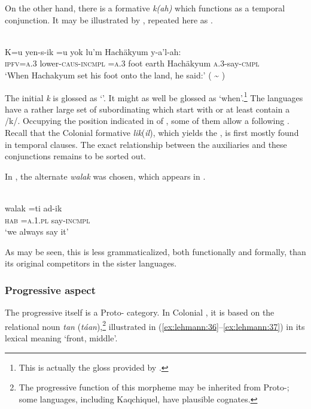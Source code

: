 \documentclass[output=paper]{langsci/langscibook}
\begin{document}
On the other hand, there is a formative \textit{k(ah)} which functions as a temporal conjunction. It may be illustrated by , repeated here as .


\ea\label{ex:lehmann:34}
\\
  \gll    K=u      yen-s-ik          =u    yok  lu’m    Hachäkyum    y-a’l-ah:\\
  \textsc{ipfv=a.3}  lower-\textsc{caus-incmpl}   \textsc{=a.3}    foot  earth    Hachäkyum     \textsc{a.3-}say\textsc{{}-cmpl}\\
\glt ‘When Hachakyum set his foot onto the land, he said:’ (\citealt[111]{Bruce1968} {\textasciitilde} \citeyear[19]{Bruce1974})
\z

The initial \textit{k} is glossed as ‘’. It might as well be glossed as ‘when’.\footnote{This is actually the gloss provided by \citet{Bruce1974}.} The  languages have a rather large set of subordinating  which start with or at least contain a /k/. Occupying the position indicated in  of , some of them allow a following . Recall that the Colonial   formative \textit{lik}(\textit{il}), which yields the   , is first mostly found in temporal clauses. The exact relationship between the  auxiliaries and these conjunctions remains to be sorted out.

In , the alternate  \textit{walak} was chosen, which appears in .

\ea\label{ex:lehmann:35}
\\
\gll     walak  =ti      ad-ik\\
  \textsc{hab }    \textsc{=a.1.pl}    say-\textsc{incmpl}\\
\glt ‘we always say it’ \citep[129]{Danziger2011}
\z



As may be seen, this is less grammaticalized, both functionally and formally, than its original competitors in the sister languages.


\subsubsection{Progressive aspect}\label{sec:lehmann:4.7.3}

The progressive itself is a Proto- category. In Colonial  , it is based on the relational noun \textit{tan} (\textit{táan}),\footnote{The progressive function of this morpheme may be inherited from Proto-; some languages, including Kaqchiquel, have plausible cognates.} illustrated in (\ref{ex:lehmann:36}–\ref{ex:lehmann:37}) in its lexical meaning ‘front, middle’.
\end{document}
